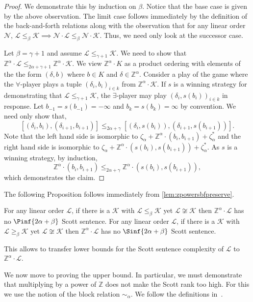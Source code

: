 \documentclass{amsart}
\newcommand{\Z}{\mathbb{Z}}
\newcommand{\K}{\mathcal{K}}
\newcommand{\N}{\mathcal{N}}
\renewcommand{\L}{\mathcal{L}}
\begin{document}
\begin{proof}
 We demonstrate this by induction on $\beta$. Notice that the base case is given by the above observation. 
 The limit case follows immediately by the definition of the back-and-forth relations along with the observation that for any linear order $\N$, $\L\leq_\beta \K \implies \N\cdot \L\leq_\beta \N\cdot \K$.
 Thus, we need only look at the successor case.

 Let $\beta=\gamma+1$ and assume $\L\leq_{\gamma+1} \K$. We need to show that
 $\Z^\alpha\cdot \L\leq_{2\alpha+\gamma+1}\Z^\alpha\cdot \K.$ We view
 $\Z^{\alpha}\cdot K$ as a product ordering with elements of the the form
 $(\delta,b)$ where $b\in K$ and $\delta\in \Z^{\alpha}$. Consider a play of the
 game where the $\forall$-player plays a tuple $(\delta_i,b_i)_{i\in k}$ from $\Z^\alpha\cdot
 \K$. If $s$ is a winning strategy for demonstrating that $\L\leq_{\gamma+1}
 \K$, the $\exists$-player may play $(\delta_i,s(b_i))_{i\in k}$ in response. Let
 $b_{-1}=s(b_{-1})=-\infty$ and $b_k=s(b_k)=\infty$ by convention. We need only
 show that, $$[(\delta_i,b_i),(\delta_{i+1},b_{i+1})] \leq_{2\alpha+\gamma}
 [(\delta_i,s(b_i)),(\delta_{i+1},s(b_{i+1}))].$$ Note that the left hand side
 is isomorphic to $\zeta_\alpha+\Z^\alpha\cdot(b_i,b_{i+1})+\zeta_\alpha^*$ and
 the right hand side is isomorphic to
 $\zeta_\alpha+\Z^\alpha\cdot(s(b_i),s(b_{i+1}))+\zeta_\alpha^*$. As $s$ is a
 winning strategy, by induction,
 \[\Z^\alpha\cdot(b_i,b_{i+1})\leq_{2\alpha+\gamma}
 \Z^\alpha\cdot(s(b_i),s(b_{i+1})),\] which demonstrates the claim.
\end{proof}



The following Proposition follows immediately from \cref{lem:zpowersbfpreserve}.
\begin{proposition}
For any linear order $\L$, if there is a $\K$ with $\L\leq_\beta \K$ yet $\L\not\cong \K$ then $\Z^\alpha\cdot \L$ has no $\Pinf{2\alpha+\beta}$ Scott sentence.
For any linear order $\L$, if there is a $\K$ with $\L\geq_\beta \K$ yet $\L\not\cong \K$ then $\Z^\alpha\cdot \L$ has no $\Sinf{2\alpha+\beta}$ Scott sentence.
\end{proposition}

This allows to transfer lower bounds for the Scott sentence complexity of $\L$ to $\Z^\alpha\cdot \L$.


We now move to proving the upper bound. In particular, we must demonstrate that
multiplying by a power of $\Z$ does not make the Scott rank too high. For this
we use the notion of the block relation $\sim_\alpha$. We follow the definitions
in~\cite{AR20}.
\end{document}
